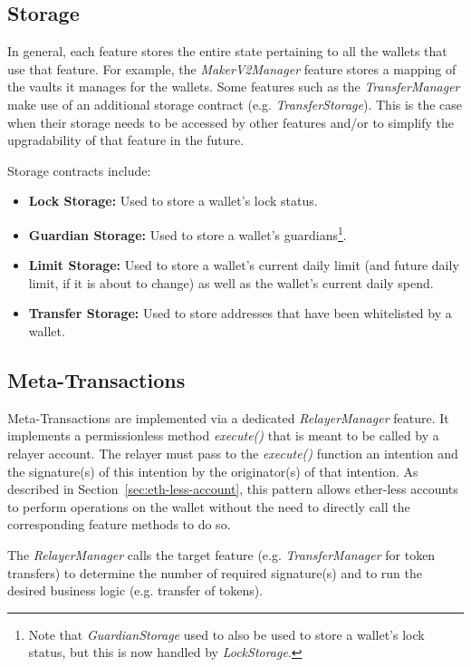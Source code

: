 \documentclass[12pt]{article}
\begin{document}
\subsection{Storage}
\label{sec:storage}
In general, each feature stores the entire state pertaining to all the wallets that use that feature. For example, the \emph{MakerV2Manager} feature stores a mapping of the vaults it manages for the wallets. Some features such as the \emph{TransferManager} make use of an additional storage contract (e.g. \emph{TransferStorage}). This is the case when their storage needs to be accessed by other features and/or to simplify the upgradability of that feature in the future.

Storage contracts include:
\begin{itemize}
\item \textbf{Lock Storage:} Used to store a wallet's lock status.
\item \textbf{Guardian Storage:} Used to store a wallet's guardians\footnote{Note that \emph{GuardianStorage} used to also be used to store a wallet's lock status, but this is now handled by \emph{LockStorage}.}.
\item \textbf{Limit Storage:} Used to store a wallet's current daily limit (and future daily limit, if it is about to change) as well as the wallet's current daily spend.
\item \textbf{Transfer Storage:} Used to store addresses that have been whitelisted by a wallet.
\end{itemize}

\subsection{Meta-Transactions}
\label{sec:meta-transactions}
Meta-Transactions are implemented via a dedicated \emph{RelayerManager} feature. It implements a permissionless method \emph{execute()} that is meant to be called by a relayer account. The relayer must pass to the \emph{execute()} function an intention and the signature(s) of this intention by the originator(s) of that intention. As described in Section~\ref{sec:eth-less-account}, this pattern allows ether-less accounts to perform operations on the wallet without the need to directly call the corresponding feature methods to do so.

The \emph{RelayerManager} calls the target feature (e.g. \emph{TransferManager} for token transfers) to determine the number of required signature(s) and to run the desired business logic (e.g. transfer of tokens).
\end{document}
